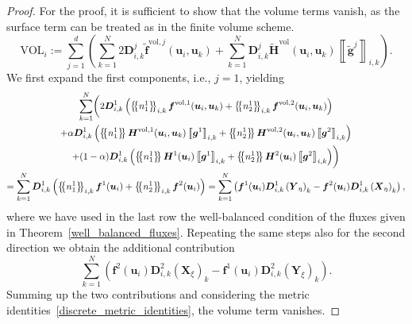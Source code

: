 \documentclass[]{scrartcl}
\newcommand*{\ldblbrace}{\{\mskip-5mu \left \{}
\newcommand*{\rdblbrace}{ \}\mskip-5mu \right \}}
\newcommand{\mean}[1]{\left\ldblbrace #1 \right\rdblbrace}
\newcommand{\mtx}[1]{\boldsymbol{#1}}
\renewcommand{\vec}[1]{\boldsymbol{#1}}
\newcommand{\jump}[1]{\left\llbracket #1  \right\rrbracket}
\theoremstyle{definition}
\begin{document}
\begin{proof}
For the proof, it is sufficient to show that the volume terms vanish, as the surface term can be treated as in the finite volume scheme.
\begin{equation}
\vec{\mathrm{VOL}}_i := \sum_{j = 1}^d \left ( \sum_{k = 1}^N 2 \mtx{D}^j_{i,k} \tilde{\vec{f}} ^{\mathrm{vol},j}\left (\vec{u}_i, \vec{u}_k \right ) + \sum_{k = 1}^N \mtx{D}^j_{i,k} \tilde{\vec{H}}^{\mathrm{vol}}\left (\vec{u}_i, \vec{u}_k \right ) \jump{\tilde{\vec{g}}^j}_{i,k} \right ).
\end{equation}
We first expand the first components, i.e., $j=1$, yielding
\begin{multline}
\sum_{k=1}^N \biggl( 2 \mtx{D}_{i,k}^1 \left (\mean{n^1_1}_{i,k} \vec{f}^{\mathrm{vol},1}(\vec{u}_i, \vec{u}_k) + \mean{n^1_2}_{i,k} \vec{f}^{\mathrm{vol},2}(\vec{u}_i, \vec{u}_k) \right )\\
+ \alpha \mtx{D}_{i,k}^1 \left ( \mean{n^1_1}\vec{H}^{\mathrm{vol},1}(\vec{u}_i, \vec{u}_k) \jump{\vec{g}^1}_{i,k} + \mean{n^1_2}\vec{H}^{\mathrm{vol},2}(\vec{u}_i, \vec{u}_k) \jump{\vec{g}^2}_{i,k} \right ) \\
+(1-\alpha) \mtx{D}_{i,k}^1 \left ( \mean{n^1_1}\vec{H}^{1}(\vec{u}_i) \jump{\vec{g}^1}_{i,k} + \mean{n^1_2}\vec{H}^{2}(\vec{u}_i) \jump{\vec{g}^2}_{i,k} \right ) \biggr) \\
 = \sum_{k=1}^N  \mtx{D}_{i,k}^1 \left (\mean{n^1_1}_{i,k} \vec{f}^1(\vec{u}_i)  + \mean{n^1_2}_{i,k} \vec{f}^2(\vec{u}_i) \right ) =
  \sum_{k=1}^N \left( \vec{f}^1(\vec{u}_i) \mtx{D}_{i,k}^1 \left ( \vec{Y}_{\eta} \right )_k - \vec{f}^2(\vec{u}_i)\mtx{D}_{i,k}^1 \left ( \vec{X}_{\eta} \right )_k \right),
\end{multline}
where we have used in the last row the well-balanced condition of the fluxes given in Theorem~\ref{well_balanced_fluxes}. Repeating the same steps also for the second direction we obtain the additional contribution
\begin{equation}
\sum_{k=1}^N \left( \vec{f}^2(\vec{u}_i)\mtx{D}_{i,k}^2 \left ( \vec{X}_{\xi} \right )_k - \vec{f}^1(\vec{u}_i)\mtx{D}_{i,k}^2 \left ( \vec{Y}_{\xi} \right )_k \right).
\end{equation}
Summing up the two contributions and considering the metric identities~\eqref{discrete_metric_identities}, the volume term vanishes.
\end{proof}
\end{document}
